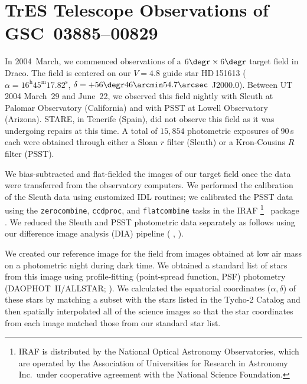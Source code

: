 \section{TrES Telescope Observations of \\ \mbox{GSC 03885--00829}}\label{cha:gsc:sec:tres}

In 2004~March, we commenced observations of a $6\degr\times6\degr$
target field in Draco. The field is centered on our $V=4.8$ guide star
\mbox{HD\,151613} (\mbox{$\alpha = 16^{\mathrm h} 45^{\mathrm m}
17.82^{\mathrm s}$}, \mbox{$\delta = +56\degr 46\arcmin 54.7\arcsec$} J2000.0). Between
UT 2004 March~29 and June~22, we observed this field nightly with
Sleuth at Palomar Observatory (California) and with PSST at Lowell
Observatory (Arizona). STARE, in Tenerife (Spain), did not observe
this field as it was undergoing repairs at this time. A total of $15,\!854$
photometric exposures of 90\,s each were obtained through either a
Sloan $r$ filter (Sleuth) or a Kron-Cousins $R$ filter (PSST).

We bias-subtracted and flat-fielded the images of our target field
once the data were transferred from the observatory computers. We
performed the calibration of the Sleuth data using customized IDL
routines; we calibrated the PSST data using the \texttt{zerocombine},
\texttt{ccdproc}, and \texttt{flatcombine} tasks in the IRAF%
\footnote{IRAF is distributed by the National Optical Astronomy
  Observatories, which are operated by the Association of Universities
  for Research in Astronomy Inc.\ under cooperative agreement with
  the National Science Foundation.}%
\ package \citep{Tody:1993a}. We reduced the Sleuth and PSST
photometric data separately as follows using our difference image
analysis (DIA) pipeline (%
\citealp[described in][]{Dunham_Mandushev_Taylor:pasp:2004a},%
\citealp[and based in part on][]{Alard:aas:2000a}).%

We created our reference image for the field from images obtained at
low air mass on a photometric night during dark time. We obtained a
standard list of stars from this image using profile-fitting (point-spread function, PSF)
photometry (\mbox{DAOPHOT II}/ALLSTAR;\@
\citealt{Stetson:pasp:1987a, Stetson:ASP:1992a}). We calculated the
equatorial coordinates ($\alpha,\delta$) of these stars by matching a
subset with the stars listed in the Tycho-2 Catalog
\citep{Hog_Fabricius_Makarov:aa:2000a} and then spatially
interpolated all of the science images so that the star coordinates
from each image matched those from our standard star list.


